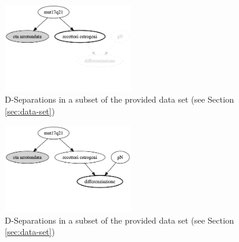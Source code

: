 \begin{figure}[htbp]
\centerline{\includegraphics[width=0.5\textwidth]{mathematical-background/images/bn-example-separations-2}}
\caption{D-Separations in a subset of the provided data set (see Section \ref{sec:data-set})}
\label{fig:bn-separations-example-2}
\end{figure}

\begin{figure}[htbp]
\centerline{\includegraphics[width=0.5\textwidth]{mathematical-background/images/bn-example-separations-3}}
\caption{D-Separations in a subset of the provided data set (see Section \ref{sec:data-set})}
\label{fig:bn-separations-example-3}
\end{figure}
